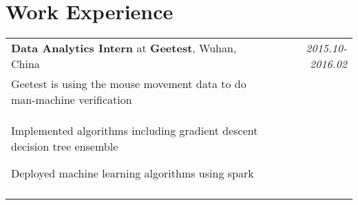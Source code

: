 \documentclass[a4paper,10pt]{article}
\begin{document}
\section{Work Experience}
\begin{tabular}{p{13.5cm}p{0.5cm}r}

\textbf{Data Analytics Intern} at \textbf{Geetest}, Wuhan, China && \emph{2015.10-2016.02} \\
\hspace{1em} Geetest is using the mouse movement data to do man-machine verification&& \vspace{0em} \\
\begin{compactitem}
  \item Implemented algorithms including gradient descent decision tree ensemble\vspace{0.2em}
  \item Deployed machine learning algorithms using spark\vspace{0.2em}
\end{compactitem}&&\vspace{-2.2em} \\
\multicolumn{3}{c}{} \\

\end{tabular}
\end{document}
